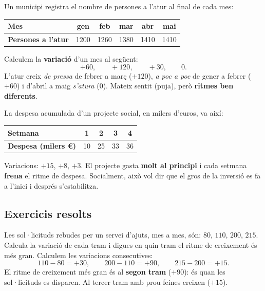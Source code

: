 \begin{exemple}
Un municipi registra el nombre de persones a l'atur al final de cada mes:
\begin{center}
\renewcommand{\arraystretch}{1.2}
\begin{tabular}{l c c c c c}
\toprule
\textbf{Mes} & gen & feb & mar & abr & mai \\
\midrule
\textbf{Persones a l'atur} & \num{1200} & \num{1260} & \num{1380} & \num{1410} & \num{1410} \\
\bottomrule
\end{tabular}
\end{center}
Calculem la \textbf{variació} d'un mes al següent:
\[
+60,\qquad +120,\qquad +30,\qquad 0.
\]
L'atur creix \emph{de pressa} de febrer a març ($+120$), \emph{a poc a poc} de gener a
febrer ($+60$) i d'abril a maig \emph{s'atura} ($0$). Mateix sentit (puja), però
\textbf{ritmes ben diferents}.
\end{exemple}

\begin{exemple}
La despesa acumulada d'un projecte social, en milers d'euros, va així:
\begin{center}
\renewcommand{\arraystretch}{1.2}
\begin{tabular}{l c c c c}
\toprule
\textbf{Setmana} & 1 & 2 & 3 & 4 \\
\midrule
\textbf{Despesa (milers \euro)} & 10 & 25 & 33 & 36 \\
\bottomrule
\end{tabular}
\end{center}
Variacions: $+15$, $+8$, $+3$. El projecte gasta \textbf{molt al principi} i cada
setmana \textbf{frena} el ritme de despesa. Socialment, això vol dir que el gros de la
inversió es fa a l'inici i després s'estabilitza.
\end{exemple}

\subsection{Exercicis resolts}

\begin{exresolt}
Les sol·licituds rebudes per un servei d'ajuts, mes a mes, són: $80$, $110$, $200$,
$215$. Calcula la variació de cada tram i digues en quin tram el ritme de creixement
és més gran.
\solucio
Calculem les variacions consecutives:
\[
110-80=+30,\qquad 200-110=+90,\qquad 215-200=+15.
\]
El ritme de creixement més gran és al \textbf{segon tram} ($+90$): és quan les
sol·licituds es disparen. Al tercer tram amb prou feines creixen ($+15$).
\end{exresolt}

